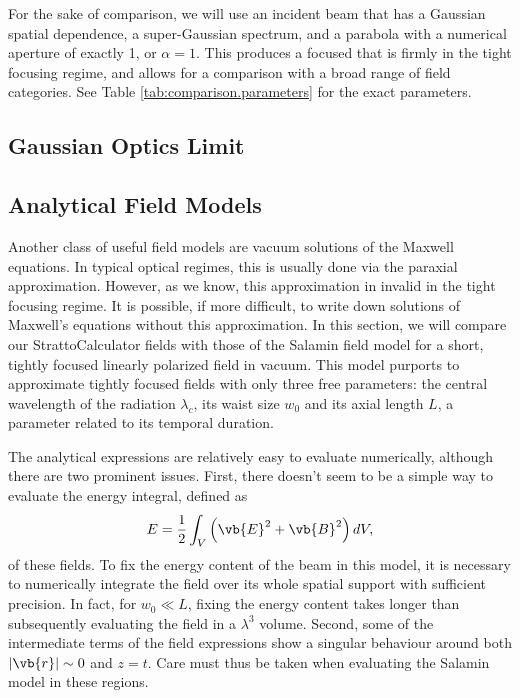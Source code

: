 \documentclass[11pt,SymmetricalJury]{inrsthesis/inrsthesis}
\begin{document}
For the sake of comparison, we will use an incident beam that has a Gaussian
spatial dependence, a super-Gaussian spectrum, and a parabola with a numerical
aperture of exactly 1, or $\alpha=1$. This produces a focused that is firmly in
the tight focusing regime, and allows for a comparison with a broad range of
field categories. See Table \ref{tab:comparison.parameters} for the exact
parameters.

\subsection{Gaussian Optics Limit}

\subsection{Analytical Field Models}

Another class of useful field models are vacuum solutions of the Maxwell
equations. In typical optical regimes, this is usually done via the paraxial
approximation. However, as we know, this approximation in invalid in the tight
focusing regime. It is possible, if more difficult, to write down solutions of
Maxwell's equations without this approximation. In this section, we will compare
our StrattoCalculator fields with those of the Salamin field model
\cite{Salamin2015b} for a short, tightly focused linearly polarized field in
vacuum. This model purports to approximate tightly focused fields with only
three free parameters: the central wavelength of the radiation $\lambda_c$, its
waist size $w_0$ and its axial length $L$, a parameter related to its temporal
duration.

The analytical expressions are relatively easy to evaluate numerically, although
there are two prominent issues. First, there doesn't seem to be a simple way to
evaluate the energy integral, defined as
  \begin{equation}
    E = \frac{1}{2}\int_V \left(\vb{E}^2+\vb{B}^2\right) dV,
  \end{equation}
of these fields. To fix the energy content of the beam in this model, it is
necessary to numerically integrate the field over its whole spatial support with
sufficient precision. In fact, for $w_0\ll L$, fixing the energy content takes
longer than subsequently evaluating the field in a $\lambda^3$ volume. Second,
some of the intermediate terms of the field expressions show a singular
behaviour around both $|\vb{r}|\sim0$ and $z=t$. Care must thus be taken when
evaluating the Salamin model in these regions.
\end{document}
